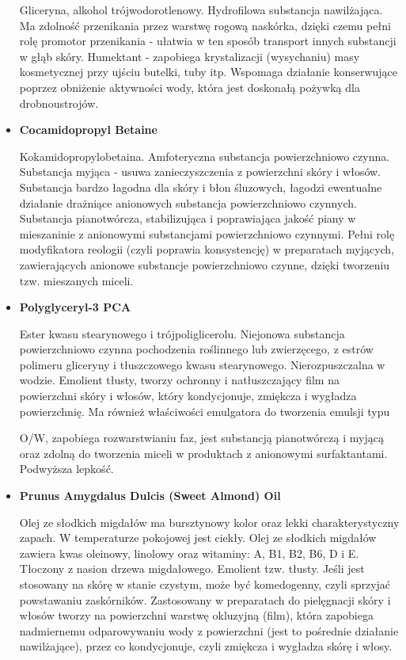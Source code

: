 \begin{itemize}
Gliceryna, alkohol trójwodorotlenowy. Hydrofilowa substancja nawilżająca. Ma zdolność przenikania przez warstwę rogową naskórka, dzięki czemu pełni rolę promotor przenikania - ułatwia w ten sposób transport innych substancji w głąb skóry. Humektant - zapobiega krystalizacji (wysychaniu) masy kosmetycznej przy ujściu butelki, tuby itp. Wspomaga działanie konserwujące poprzez obniżenie aktywności wody, która jest doskonałą pożywką dla drobnoustrojów.

\item \textbf{Cocamidopropyl Betaine}

Kokamidopropylobetaina. Amfoteryczna substancja powierzchniowo czynna. Substancja myjąca - usuwa zanieczyszczenia z powierzchni skóry i włosów. Substancja bardzo łagodna dla skóry i błon śluzowych, łagodzi ewentualne działanie drażniące anionowych substancja powierzchniowo czynnych. Substancja pianotwórcza, stabilizująca i poprawiająca jakość piany w mieszaninie z anionowymi substancjami powierzchniowo czynnymi. Pełni rolę modyfikatora reologii (czyli poprawia konsystencję) w preparatach myjących, zawierających anionowe substancje powierzchniowo czynne, dzięki tworzeniu tzw. mieszanych miceli.

\item \textbf{Polyglyceryl-3 PCA}

Ester kwasu stearynowego i trójpoliglicerolu. Niejonowa substancja powierzchniowo czynna pochodzenia roślinnego lub zwierzęcego, z estrów polimeru gliceryny i tłuszczowego kwasu stearynowego. Nierozpuszczalna w wodzie. Emolient tłusty, tworzy ochronny i natłuszczający film na powierzchni skóry i włosów, który kondycjonuje, zmiękcza i wygładza powierzchnię. Ma również właściwości emulgatora do tworzenia emulsji typu

O/W, zapobiega rozwarstwianiu faz, jest substancją pianotwórczą i myjącą oraz zdolną do tworzenia miceli w produktach z anionowymi surfaktantami. Podwyższa lepkość.

\item \textbf{Prunus Amygdalus Dulcis (Sweet Almond) Oil}

Olej ze słodkich migdałów ma bursztynowy kolor oraz lekki charakterystyczny zapach. W temperaturze pokojowej jest ciekły. Olej ze słodkich migdałów zawiera kwas oleinowy, linolowy oraz witaminy: A, B1, B2, B6, D i E. Tłoczony z nasion drzewa migdałowego. Emolient tzw. tłusty. Jeśli jest stosowany na skórę w stanie czystym, może być komedogenny, czyli sprzyjać powstawaniu zaskórników. Zastosowany w preparatach do pielęgnacji skóry i włosów tworzy na powierzchni warstwę okluzyjną (film), która zapobiega nadmiernemu odparowywaniu wody z powierzchni (jest to pośrednie działanie nawilżające), przez co kondycjonuje, czyli zmiękcza i wygładza skórę i włosy.


\end{itemize}

